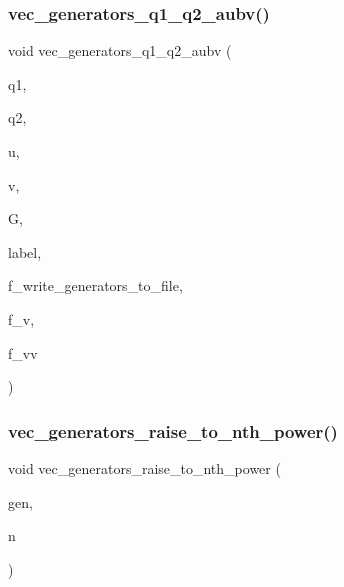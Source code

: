 \subsubsection{\texorpdfstring{vec\+\_\+generators\+\_\+q1\+\_\+q2\+\_\+aubv()}{vec\_generators\_q1\_q2\_aubv()}}
{\footnotesize\ttfamily void vec\+\_\+generators\+\_\+q1\+\_\+q2\+\_\+aubv (\begin{DoxyParamCaption}\item[{\mbox{\hyperlink{galois_8h_a09fddde158a3a20bd2dcadb609de11dc}{I\+NT}}}]{q1,  }\item[{\mbox{\hyperlink{galois_8h_a09fddde158a3a20bd2dcadb609de11dc}{I\+NT}}}]{q2,  }\item[{\mbox{\hyperlink{galois_8h_a09fddde158a3a20bd2dcadb609de11dc}{I\+NT}}}]{u,  }\item[{\mbox{\hyperlink{galois_8h_a09fddde158a3a20bd2dcadb609de11dc}{I\+NT}}}]{v,  }\item[{\mbox{\hyperlink{class_vector}{Vector}} \&}]{G,  }\item[{\mbox{\hyperlink{classhollerith}{hollerith}} \&}]{label,  }\item[{\mbox{\hyperlink{galois_8h_a09fddde158a3a20bd2dcadb609de11dc}{I\+NT}}}]{f\+\_\+write\+\_\+generators\+\_\+to\+\_\+file,  }\item[{\mbox{\hyperlink{galois_8h_a09fddde158a3a20bd2dcadb609de11dc}{I\+NT}}}]{f\+\_\+v,  }\item[{\mbox{\hyperlink{galois_8h_a09fddde158a3a20bd2dcadb609de11dc}{I\+NT}}}]{f\+\_\+vv }\end{DoxyParamCaption})}

\mbox{\label{perm__group__gens_8_c_ae2abdba2094e87b7f58ee9042738b4f5}} 
\subsubsection{\texorpdfstring{vec\+\_\+generators\+\_\+raise\+\_\+to\+\_\+nth\+\_\+power()}{vec\_generators\_raise\_to\_nth\_power()}}
{\footnotesize\ttfamily void vec\+\_\+generators\+\_\+raise\+\_\+to\+\_\+nth\+\_\+power (\begin{DoxyParamCaption}\item[{\mbox{\hyperlink{class_vector}{Vector}} \&}]{gen,  }\item[{\mbox{\hyperlink{galois_8h_a09fddde158a3a20bd2dcadb609de11dc}{I\+NT}}}]{n }\end{DoxyParamCaption})}

